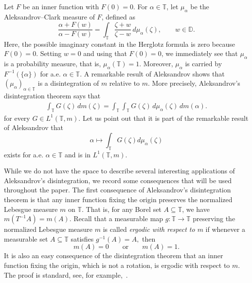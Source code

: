 \documentclass[12pt, reqno, final, a4paper]{amsart}
\theoremstyle{plain}
\theoremstyle{definition}
\theoremstyle{remark}
\newcommand{\D}{\mathbb D}
\newcommand{\T}{\mathbb T}
\newcommand{\1}{\mathbf 1}
\begin{document}
Let $F$ be an inner function with $F(0)=0$.  For $\alpha\in\T$, let $\mu_\alpha$
be the Aleksandrov--Clark measure of $F$, defined as
\[
        \frac{\alpha+F(w)}{\alpha-F(w)}
        =\int_{\T}\frac{\zeta+w}{\zeta-w}\,d\mu_\alpha(\zeta),
        \qquad w\in\D. 
\]
Here, the possible imaginary constant in the Herglotz formula is zero because $F(0)=0$. Setting $w=0$ and using that $F(0)=0$, we immediately see that $\mu_{\alpha}$ is a probability measure, that is, $\mu_\alpha(\T)=1$. Moreover,
$\mu_\alpha$ is carried by $F^{-1}(\{\alpha\})$ for a.e. $\alpha\in \T$. A remarkable result of Aleksandrov shows that $(\mu_{\alpha})_{\alpha\in \T}$ is a disintegration of $m$ relative to $m$. More precisely, Aleksandrov's disintegration theorem says that
\begin{align}\label{eqn_theorem:AD}
\int_{\T} G(\zeta)\,dm(\zeta)
=
\int_{\T}\int_{\T} G(\zeta)\,d\mu_\alpha(\zeta)\,dm(\alpha).
\end{align}
for every $G\in L^1(\T,m)$. Let us point out that it is part of the remarkable result of Aleksandrov that $$\alpha\mapsto \int_{\T}G(\zeta)d\mu_{\alpha}(\zeta)$$ exists for a.e. $\alpha\in \T$ and is in $L^1(\T,m)$. 


While we do not have the space to describe several interesting applications of Aleksandrov's disintegration, we record some consequences that will be used throughout the paper. The first consequence of Aleksandrov's disintegration theorem is that any inner function fixing the origin preserves the normalized Lebesgue measure $m$ on $\T$. That is, for any Borel set $A\subseteq \T$, we have $m(T^{-1}A)=m(A)$. 
Recall that a measurable map \(g:\mathbb T\to\mathbb T\) preserving
the normalized Lebesgue measure \(m\) is called \emph{ergodic with respect to $m$} if
whenever a measurable set \(A\subseteq \mathbb T\) satisfies
$g^{-1}(A)=A,$ then
\[
m(A)=0
\qquad \text{or} \qquad
m(A)=1.
\]
It is also an easy consequence of the disintegration theorem that an inner function fixing the origin, which is not a rotation, is ergodic with respect to $m$. The proof is standard, see, for example,~\cite{AaronsonBook, Pommerenke1981}. 
\end{document}
